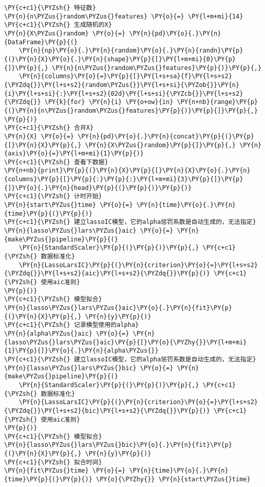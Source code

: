 \begin{Verbatim}[commandchars=\\\{\}]
\PY{c+c1}{\PYZsh{} 特征数}
\PY{n}{n\PYZus{}random\PYZus{}features} \PY{o}{=} \PY{l+m+mi}{14}
\PY{c+c1}{\PYZsh{} 生成随机的X}
\PY{n}{X\PYZus{}random} \PY{o}{=} \PY{n}{pd}\PY{o}{.}\PY{n}{DataFrame}\PY{p}{(}
    \PY{n}{np}\PY{o}{.}\PY{n}{random}\PY{o}{.}\PY{n}{randn}\PY{p}{(}\PY{n}{X}\PY{o}{.}\PY{n}{shape}\PY{p}{[}\PY{l+m+mi}{0}\PY{p}{]}\PY{p}{,} \PY{n}{n\PYZus{}random\PYZus{}features}\PY{p}{)}\PY{p}{,}
    \PY{n}{columns}\PY{o}{=}\PY{p}{[}\PY{l+s+sa}{f}\PY{l+s+s2}{\PYZdq{}}\PY{l+s+s2}{random\PYZus{}}\PY{l+s+si}{\PYZob{}}\PY{n}{i}\PY{l+s+si}{:}\PY{l+s+s2}{02d}\PY{l+s+si}{\PYZcb{}}\PY{l+s+s2}{\PYZdq{}} \PY{k}{for} \PY{n}{i} \PY{o+ow}{in} \PY{n+nb}{range}\PY{p}{(}\PY{n}{n\PYZus{}random\PYZus{}features}\PY{p}{)}\PY{p}{]}\PY{p}{,}
\PY{p}{)}
\PY{c+c1}{\PYZsh{} 合并X}
\PY{n}{X} \PY{o}{=} \PY{n}{pd}\PY{o}{.}\PY{n}{concat}\PY{p}{(}\PY{p}{[}\PY{n}{X}\PY{p}{,} \PY{n}{X\PYZus{}random}\PY{p}{]}\PY{p}{,} \PY{n}{axis}\PY{o}{=}\PY{l+m+mi}{1}\PY{p}{)}
\PY{c+c1}{\PYZsh{} 查看下数据}
\PY{n+nb}{print}\PY{p}{(}\PY{n}{X}\PY{p}{[}\PY{n}{X}\PY{o}{.}\PY{n}{columns}\PY{p}{[}\PY{p}{:}\PY{p}{:}\PY{l+m+mi}{3}\PY{p}{]}\PY{p}{]}\PY{o}{.}\PY{n}{head}\PY{p}{(}\PY{p}{)}\PY{p}{)}
\PY{c+c1}{\PYZsh{} 计时开始}
\PY{n}{start\PYZus{}time} \PY{o}{=} \PY{n}{time}\PY{o}{.}\PY{n}{time}\PY{p}{(}\PY{p}{)}
\PY{c+c1}{\PYZsh{} 建立lassoIC模型，它的alpha惩罚系数是自动生成的，无法指定}
\PY{n}{lasso\PYZus{}lars\PYZus{}aic} \PY{o}{=} \PY{n}{make\PYZus{}pipeline}\PY{p}{(}
    \PY{n}{StandardScaler}\PY{p}{(}\PY{p}{)}\PY{p}{,} \PY{c+c1}{\PYZsh{} 数据标准化}
    \PY{n}{LassoLarsIC}\PY{p}{(}\PY{n}{criterion}\PY{o}{=}\PY{l+s+s2}{\PYZdq{}}\PY{l+s+s2}{aic}\PY{l+s+s2}{\PYZdq{}}\PY{p}{)} \PY{c+c1}{\PYZsh{} 使用aic准则}
\PY{p}{)}
\PY{c+c1}{\PYZsh{} 模型拟合}
\PY{n}{lasso\PYZus{}lars\PYZus{}aic}\PY{o}{.}\PY{n}{fit}\PY{p}{(}\PY{n}{X}\PY{p}{,} \PY{n}{y}\PY{p}{)}
\PY{c+c1}{\PYZsh{} 记录模型使用的alpha}
\PY{n}{alpha\PYZus{}aic} \PY{o}{=} \PY{n}{lasso\PYZus{}lars\PYZus{}aic}\PY{p}{[}\PY{o}{\PYZhy{}}\PY{l+m+mi}{1}\PY{p}{]}\PY{o}{.}\PY{n}{alpha\PYZus{}}
\PY{c+c1}{\PYZsh{} 建立lassoIC模型，它的alpha惩罚系数是自动生成的，无法指定}
\PY{n}{lasso\PYZus{}lars\PYZus{}bic} \PY{o}{=} \PY{n}{make\PYZus{}pipeline}\PY{p}{(}
    \PY{n}{StandardScaler}\PY{p}{(}\PY{p}{)}\PY{p}{,} \PY{c+c1}{\PYZsh{} 数据标准化}
    \PY{n}{LassoLarsIC}\PY{p}{(}\PY{n}{criterion}\PY{o}{=}\PY{l+s+s2}{\PYZdq{}}\PY{l+s+s2}{bic}\PY{l+s+s2}{\PYZdq{}}\PY{p}{)} \PY{c+c1}{\PYZsh{} 使用aic准则}
\PY{p}{)}
\PY{c+c1}{\PYZsh{} 模型拟合}
\PY{n}{lasso\PYZus{}lars\PYZus{}bic}\PY{o}{.}\PY{n}{fit}\PY{p}{(}\PY{n}{X}\PY{p}{,} \PY{n}{y}\PY{p}{)}
\PY{c+c1}{\PYZsh{} 拟合时间}
\PY{n}{fit\PYZus{}time} \PY{o}{=} \PY{n}{time}\PY{o}{.}\PY{n}{time}\PY{p}{(}\PY{p}{)} \PY{o}{\PYZhy{}} \PY{n}{start\PYZus{}time}

\end{Verbatim}
